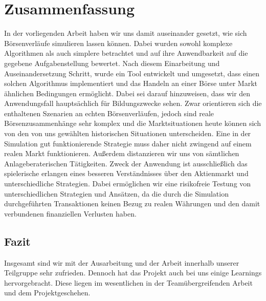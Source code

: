 \chapter{Zusammenfassung}

In der vorliegenden Arbeit haben wir uns damit auseinander gesetzt, wie sich Börsenverläufe simulieren lassen können. Dabei wurden sowohl komplexe Algorithmen als auch simplere betrachtet und auf ihre Anwendbarkeit auf die gegebene Aufgabenstellung bewertet. Nach diesem Einarbeitung und Auseinandersetzung Schritt, wurde ein Tool entwickelt und umgesetzt, dass einen solchen Algorithmus implementiert und das Handeln an einer Börse unter Markt ähnlichen Bedingungen ermöglicht. Dabei sei darauf hinzuweisen, dass wir den Anwendungsfall hauptsächlich für Bildungszwecke sehen. Zwar orientieren sich die enthaltenen Szenarien an echten Börsenverläufen, jedoch sind reale Börsenzusammenhänge sehr komplex und die Marktsituationen heute können sich von den von uns gewählten historischen Situationen unterscheiden. Eine in der Simulation gut funktionierende Strategie muss daher nicht zwingend auf einem realen Markt funktionieren. Außerdem distanzieren wir uns von sämtlichen Anlageberaterischen Tätigkeiten. Zweck der Anwendung ist ausschließlich das spielerische erlangen eines besseren Verständnisses über den Aktienmarkt und unterschiedliche Strategien. Dabei ermöglichen wir eine risikofreie Testung von unterschiedlichen Strategien und Ansätzen, da die durch die Simulation durchgeführten Transaktionen keinen Bezug zu realen Währungen und den damit verbundenen finanziellen Verlusten haben. 

\section{Fazit}
Insgesamt sind wir mit der Ausarbeitung und der Arbeit innerhalb unserer Teilgruppe sehr zufrieden. Dennoch hat das Projekt auch bei uns einige Learnings hervorgebracht. Diese liegen im wesentlichen in der Teamübergreifenden Arbeit und dem Projektgeschehen. 


